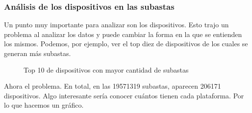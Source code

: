 \documentclass[a4paper, 12pt]{article}
\begin{document}
	\subsubsection{Análisis de los dispositivos en las subastas}
	 Un punto muy importante para analizar son los dispositivos. Esto trajo un problema al analizar los datos y puede cambiar la forma en la que se entienden los mismos.
	Podemos, por ejemplo, ver el top diez de dispositivos de los cuales se generan más subastas.
	\FloatBarrier
		\begin{figure}
			\centering
		   	\caption{Top 10 de dispositivos con mayor cantidad de subastas}
			\label{top10devicessubastas}
		\end{figure}
	\FloatBarrier

	 Ahora el problema.\newline
	 En total, en las 19571319 subastas, aparecen 206171 dispositivos. Algo interesante sería conocer cuántos tienen cada plataforma. Por lo que hacemos un gráfico.
\end{document}
